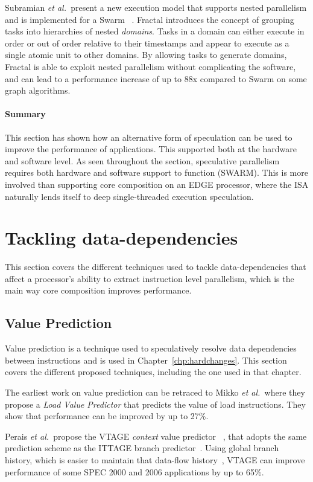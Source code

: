 Subramian {\it et al.~}present a new execution model that supports nested parallelism and is implemented for a Swarm~\cite{fractal2017} .
Fractal introduces the concept of grouping tasks into hierarchies of nested \textit{domains}.
Tasks in a domain can either execute in order or out of order relative to their timestamps and appear to execute as a single atomic unit to other domains.
By allowing tasks to generate domains, Fractal is able to exploit nested parallelism without complicating the software, and can lead to a performance increase of up to 88x compared to Swarm on some graph algorithms.
\vspace{-1em}
\paragraph*{Summary}
This section has shown how an alternative form of speculation can be used to improve the performance of applications.
This supported both at the hardware and software level.
As seen throughout the section, speculative parallelism requires both hardware and software support to function (SWARM).
This is more involved than supporting core composition on an EDGE processor, where the ISA naturally lends itself to deep single-threaded execution speculation.
\vspace{-1em}
\section{Tackling data-dependencies}
This section covers the different techniques used to tackle data-dependencies that affect a processor's ability to extract instruction level parallelism, which is the main way core composition improves performance.
\subsection{Value Prediction}
Value prediction is a technique used to speculatively resolve data dependencies between instructions and is used in Chapter~\ref{chp:hardchanges}.
This section covers the different proposed techniques, including the one used in that chapter. 

The earliest work on value prediction can be retraced to Mikko {\it et al.~}where they propose a \textit{Load Value Predictor} \cite{lipasti96valpred} that predicts the value of load instructions.
They show that performance can be improved by up to 27\%.

Perais {\it et al.~}propose the VTAGE \textit{context} value predictor ~\cite{peraisVTAGE2014}, that adopts the same prediction scheme as the ITTAGE branch predictor~\cite{SeznecITTAGE}.
Using global branch history, which is easier to maintain that data-flow history~\cite{peraisVTAGE2014}, VTAGE can improve performance of some SPEC 2000 and 2006 applications by up to 65\%.

